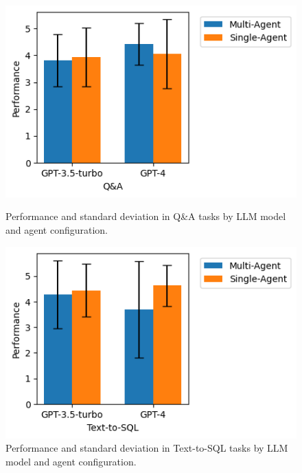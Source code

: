                 \begin{figure}[h]
                    \centering
                    \begin{minipage}{.48\textwidth}
                        \centering                
                        \includegraphics[width=1\linewidth]{images/performance_QA.png}
                        \caption{Performance and standard deviation in Q\&A tasks by LLM model and agent configuration.}
                        \label{fig:performance_QA}
                    \end{minipage}
                    \hspace{0.2cm}
                    \begin{minipage}{.48\textwidth}
                        \centering
                        \includegraphics[width=1\linewidth]{images/performance_text2sql.png}
                        \caption{Performance and standard deviation in Text-to-SQL tasks by LLM model and agent configuration.}
                        \label{fig:performance_text2sql}
                    \end{minipage}%
                \end{figure}


